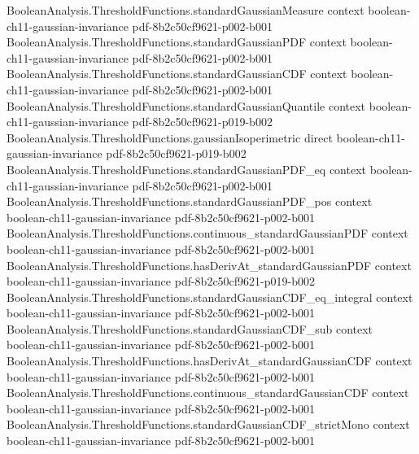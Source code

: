 \begin{lemma}
\leanok
{}
\proofstep
  {BooleanAnalysis.ThresholdFunctions.standardGaussianMeasure}
  {context}
  {boolean-ch11-gaussian-invariance}
  {pdf-8b2c50cf9621-p002-b001}
\proofstep
  {BooleanAnalysis.ThresholdFunctions.standardGaussianPDF}
  {context}
  {boolean-ch11-gaussian-invariance}
  {pdf-8b2c50cf9621-p002-b001}
\proofstep
  {BooleanAnalysis.ThresholdFunctions.standardGaussianCDF}
  {context}
  {boolean-ch11-gaussian-invariance}
  {pdf-8b2c50cf9621-p002-b001}
\proofstep
  {BooleanAnalysis.ThresholdFunctions.standardGaussianQuantile}
  {context}
  {boolean-ch11-gaussian-invariance}
  {pdf-8b2c50cf9621-p019-b002}
\proofstep
  {BooleanAnalysis.ThresholdFunctions.gaussianIsoperimetric}
  {direct}
  {boolean-ch11-gaussian-invariance}
  {pdf-8b2c50cf9621-p019-b002}
\proofstep
  {BooleanAnalysis.ThresholdFunctions.standardGaussianPDF_eq}
  {context}
  {boolean-ch11-gaussian-invariance}
  {pdf-8b2c50cf9621-p002-b001}
\proofstep
  {BooleanAnalysis.ThresholdFunctions.standardGaussianPDF_pos}
  {context}
  {boolean-ch11-gaussian-invariance}
  {pdf-8b2c50cf9621-p002-b001}
\proofstep
  {BooleanAnalysis.ThresholdFunctions.continuous_standardGaussianPDF}
  {context}
  {boolean-ch11-gaussian-invariance}
  {pdf-8b2c50cf9621-p002-b001}
\proofstep
  {BooleanAnalysis.ThresholdFunctions.hasDerivAt_standardGaussianPDF}
  {context}
  {boolean-ch11-gaussian-invariance}
  {pdf-8b2c50cf9621-p019-b002}
\proofstep
  {BooleanAnalysis.ThresholdFunctions.standardGaussianCDF_eq_integral}
  {context}
  {boolean-ch11-gaussian-invariance}
  {pdf-8b2c50cf9621-p002-b001}
\proofstep
  {BooleanAnalysis.ThresholdFunctions.standardGaussianCDF_sub}
  {context}
  {boolean-ch11-gaussian-invariance}
  {pdf-8b2c50cf9621-p002-b001}
\proofstep
  {BooleanAnalysis.ThresholdFunctions.hasDerivAt_standardGaussianCDF}
  {context}
  {boolean-ch11-gaussian-invariance}
  {pdf-8b2c50cf9621-p002-b001}
\proofstep
  {BooleanAnalysis.ThresholdFunctions.continuous_standardGaussianCDF}
  {context}
  {boolean-ch11-gaussian-invariance}
  {pdf-8b2c50cf9621-p002-b001}
\proofstep
  {BooleanAnalysis.ThresholdFunctions.standardGaussianCDF_strictMono}
  {context}
  {boolean-ch11-gaussian-invariance}
  {pdf-8b2c50cf9621-p002-b001}

\end{lemma}
